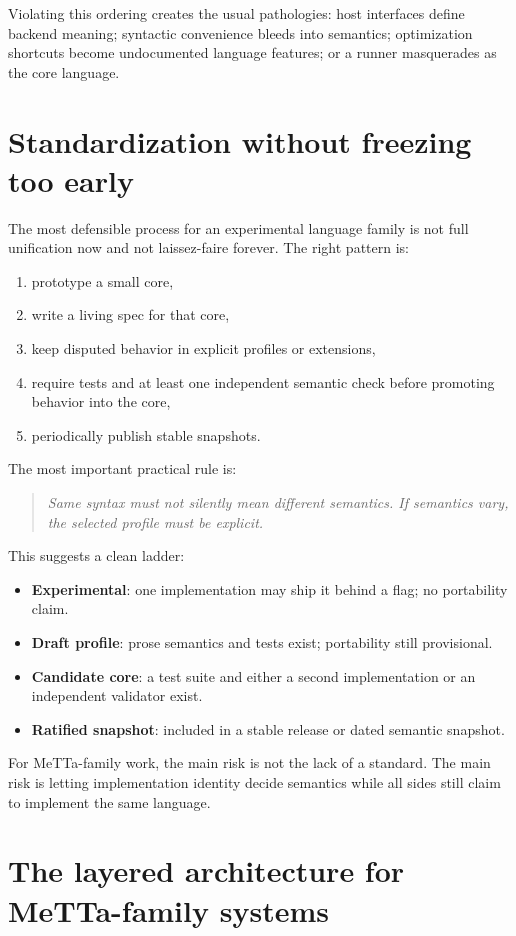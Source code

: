 \documentclass[11pt]{article}
\begin{document}
Violating this ordering creates the usual pathologies: host interfaces define backend meaning; syntactic convenience bleeds into semantics; optimization shortcuts become undocumented language features; or a runner masquerades as the core language.

\section{Standardization without freezing too early}
The most defensible process for an experimental language family is not full unification now and not laissez-faire forever. The right pattern is:
\begin{enumerate}
  \item prototype a small core,
  \item write a living spec for that core,
  \item keep disputed behavior in explicit profiles or extensions,
  \item require tests and at least one independent semantic check before promoting behavior into the core,
  \item periodically publish stable snapshots.
\end{enumerate}

The most important practical rule is:
\begin{quote}
\emph{Same syntax must not silently mean different semantics. If semantics vary, the selected profile must be explicit.}
\end{quote}

This suggests a clean ladder:
\begin{itemize}
  \item \textbf{Experimental}: one implementation may ship it behind a flag; no portability claim.
  \item \textbf{Draft profile}: prose semantics and tests exist; portability still provisional.
  \item \textbf{Candidate core}: a test suite and either a second implementation or an independent validator exist.
  \item \textbf{Ratified snapshot}: included in a stable release or dated semantic snapshot.
\end{itemize}

For MeTTa-family work, the main risk is not the lack of a standard. The main risk is letting implementation identity decide semantics while all sides still claim to implement the same language.

\section{The layered architecture for MeTTa-family systems}
\end{document}
